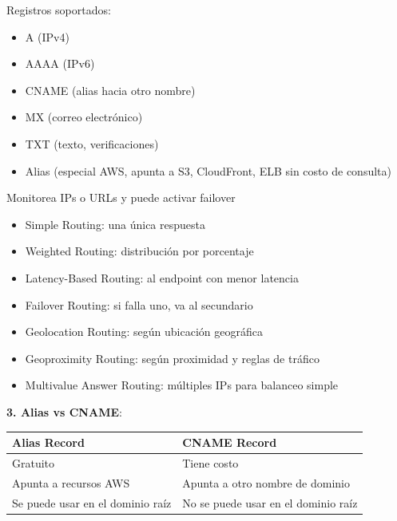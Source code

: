 \documentclass[12pt,a4paper]{report}
\begin{document}
\begin{conceptbox}
Registros soportados:
\begin{itemize}
    \item A (IPv4)
    \item AAAA (IPv6)
    \item CNAME (alias hacia otro nombre)
    \item MX (correo electrónico)
    \item TXT (texto, verificaciones)
    \item Alias (especial AWS, apunta a S3, CloudFront, ELB sin costo de consulta)
\end{itemize}
\end{conceptbox}

\begin{conceptbox}
Monitorea IPs o URLs y puede activar failover
\end{conceptbox}

\begin{conceptbox}
\begin{itemize}
    \item Simple Routing: una única respuesta
    \item Weighted Routing: distribución por porcentaje
    \item Latency-Based Routing: al endpoint con menor latencia
    \item Failover Routing: si falla uno, va al secundario
    \item Geolocation Routing: según ubicación geográfica
    \item Geoproximity Routing: según proximidad y reglas de tráfico
    \item Multivalue Answer Routing: múltiples IPs para balanceo simple
\end{itemize}
\end{conceptbox}

\textbf{3. Alias vs CNAME}:

\begin{center}
\begin{longtable}{|p{6cm}|p{7cm}|}
\hline
\cellcolor{awsblue!20}\textbf{Alias Record} & \cellcolor{awsblue!20}\textbf{CNAME Record} \\
\hline
Gratuito & Tiene costo \\
\hline
Apunta a recursos AWS & Apunta a otro nombre de dominio \\
\hline
Se puede usar en el dominio raíz & No se puede usar en el dominio raíz \\
\hline
\end{longtable}
\end{center}
\end{document}
